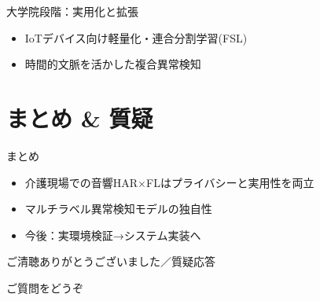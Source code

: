 \documentclass[unicode,12pt,aspectratio=169,dvipdfmx]{beamer}
\begin{document}
\begin{frame}{大学院段階：実用化と拡張}
  \begin{itemize}
    \item IoTデバイス向け軽量化・連合分割学習(FSL)
    \item 時間的文脈を活かした複合異常検知
  \end{itemize}
\end{frame}

\section{まとめ \& 質疑}

\begin{frame}{まとめ}
  \begin{itemize}
    \item 介護現場での音響HAR×FLはプライバシーと実用性を両立
    \item マルチラベル異常検知モデルの独自性
    \item 今後：実環境検証→システム実装へ
  \end{itemize}
\end{frame}

\begin{frame}{ご清聴ありがとうございました／質疑応答}
  \begin{center}
    ご質問をどうぞ
  \end{center}
\end{frame}
\end{document}
